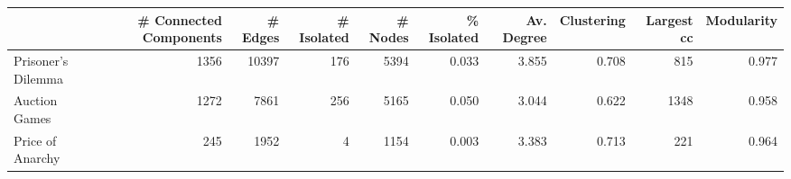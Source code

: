 \begin{tabular}{lrrrrrrrrr}
\toprule
{} &  \# Connected Components &  \# Edges &  \# Isolated &  \# Nodes &  \% Isolated &  Av. Degree &  Clustering &  Largest cc &  Modularity \\
\midrule
Prisoner's Dilemma &                    1356 &    10397 &         176 &     5394 &       0.033 &       3.855 &       0.708 &         815 &       0.977 \\
Auction Games      &                    1272 &     7861 &         256 &     5165 &       0.050 &       3.044 &       0.622 &        1348 &       0.958 \\
Price of Anarchy   &                     245 &     1952 &           4 &     1154 &       0.003 &       3.383 &       0.713 &         221 &       0.964 \\
\bottomrule
\end{tabular}
